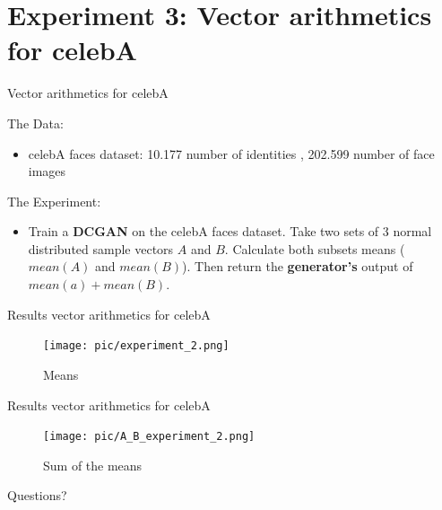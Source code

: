 \documentclass[10pt]{beamer}
\begin{document}
\section{Experiment 3: Vector arithmetics for celebA}

{
\begin{frame}{Vector arithmetics for celebA}
      \begin{block}{The Data:}
	\begin{itemize}
    \item celebA faces dataset: 10.177 number of identities
    , 202.599 number of face images
  \end{itemize}
    \end{block}
        \begin{block}{The Experiment:}
	\begin{itemize}
	\item Train a \textbf{DCGAN} on the celebA faces dataset. Take two sets of 3 normal distributed sample vectors $A$ and $B$. Calculate both subsets means ($mean(A)$ and $mean(B)$). Then return the \textbf{generator's} output of $mean(a) + mean(B)$.
  \end{itemize}
    \end{block}
\end{frame}
}

{
\begin{frame}{Results vector arithmetics for celebA}
\begin{figure}[htbp] 
  \centering
     \texttt{[image: pic/experiment\_2.png]}
  \caption{Means}
  \label{fig:Bild1}
\end{figure}
\end{frame}
}

{
\begin{frame}{Results vector arithmetics for celebA}
\begin{figure}[htbp] 
  \centering
     \texttt{[image: pic/A\_B\_experiment\_2.png]}
  \caption{Sum of the means }
  \label{fig:Bild1}
\end{figure}
\end{frame}
}


\begin{frame}[standout]
  Questions?
\end{frame}
\end{document}
